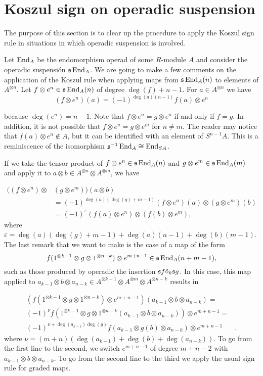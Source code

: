 \documentclass[Thesis.tex]{subfiles}
\begin{document}
\section{Koszul sign on operadic suspension}\label{koszulsigns}
The purpose of this section is to clear up the procedure to apply the Koszul sign rule in situations in which operadic suspension is involved.

Let $\operatorname{End}_A$ be the endomorphism operad of some $R$-module $A$ and consider the operadic suspensión $\mathfrak{s}\operatorname{End}_A$. We are going to make a few comments on the application of the Koszul rule when applying maps from $\mathfrak{s}\operatorname{End}_A(n)$ to elements of $A^{\otimes n}$. Let $f\otimes e^n\in\mathfrak{s}\operatorname{End}_A(n)$  of degree $\deg(f)+n-1$. %
For $a\in A^{\otimes n}$ we have \[(f\otimes e^n)(a)=(-1)^{\deg(a)(n-1)}f(a)\otimes e^n\]

because $\deg(e^n)=n-1$. Note that $f\otimes e^n=g\otimes e^n$ if and only if $f=g$. In addition, it is not possible that $f\otimes e^n=g\otimes e^m$ for $n\neq m$. %
The reader may notice that $f(a)\otimes  e^n\notin A$, but it can be identified with an element of $S^{n-1}A$. This is a reminiscence of the isomorphism $\mathfrak{s}^{-1}\operatorname{End}_A\cong \operatorname{End}_{SA}$. %
 

If we take the tensor product of $f\otimes e^n\in\mathfrak{s}\operatorname{End}_A(n)$ and $g\otimes e^m\in\mathfrak{s}\operatorname{End}_A(m)$ and apply it to $a\otimes b\in A^{\otimes n}\otimes A^{\otimes m}$, we have

\begin{align*}
((f\otimes e^n)\otimes &( g\otimes e^m))(a\otimes b)\\
&=(-1)^{\deg(a)(\deg(g)+m-1)}(f\otimes e^n)(a)\otimes( g\otimes e^m)(b)\\
&=(-1)^{\varepsilon}(f(a)\otimes e^n)\otimes(f(b)\otimes e^m),
\end{align*}
where $\varepsilon = \deg(a)(\deg(g)+m-1)+\deg(a)(n-1)+\deg(b)(m-1)$. 
The last remark that we want to make is the case of a map of the form 
\[f(1^{\otimes k-1}\otimes g\otimes 1^{\otimes n-k})\otimes e^{m+n-1}\in\mathfrak{s}\operatorname{End}_A(n+m-1),\] 
such as those produced by operadic the insertion $\mathfrak{s} f\tilde{\circ}_{k} \mathfrak{s} g$. In this case, this map applied to $a_{k-1}\otimes b\otimes a_{n-k}\in A^{\otimes k-1}\otimes A^{\otimes m}\otimes A
^{\otimes n-k}$ results in

\begin{align*}
(f(1^{\otimes k-1}\otimes g\otimes 1^{\otimes n-k})\otimes e^{m+n-1})(a_{k-1}\otimes b\otimes a_{n-k})=&\\
(-1)^{\nu}f(1^{\otimes k-1}\otimes g\otimes 1^{\otimes n-k}(a_{k-1}\otimes b\otimes a_{n-k}))\otimes e^{m+n-1}=&\\
(-1)^{\nu+\deg(a_{k-1})\deg(g)}f(a_{k-1}\otimes g(b)\otimes a_{n-k})\otimes e^{m+n-1}&.
\end{align*}
where $\nu=(m+n)(\deg(a_{k-1})+\deg(b)+\deg(a_{n-k}))$.
To go from the first line to the second, we switch $e^{m+n-1}$ of degree $m+n-2$  with $a_{k-1}\otimes b\otimes a_{n-k}$. To go from the second line to the third we apply the usual sign rule for graded maps.
\end{document}
